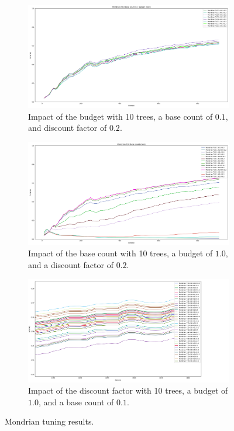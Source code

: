 \begin{figure}
	 \centering
	 \begin{subfigure}[b]{0.49\textwidth}
		 \centering
		 \includegraphics[width=\textwidth]{figures/Banos_S1_shuf_Mondrian_T10_bc_0.1_budget_check.png}
		 \caption{Impact of the budget with 10 trees, a base count of $0.1$, and discount factor of $0.2$.}
		 \label{fig:mondrian-budget}
	 \end{subfigure}
	 \hfill
	 \begin{subfigure}[b]{0.49\textwidth}
		 \centering
		 \includegraphics[width=\textwidth]{figures/Banos_S1_shuf_Mondrian_T10_check.png}
		 \caption{Impact of the base count with 10 trees, a budget of $1.0$, and a discount factor of $0.2$.}
		 \label{fig:mondrian-base-count}
	 \end{subfigure}
	 \hfill
	 \begin{subfigure}[b]{0.49\textwidth}
		 \centering
		 \includegraphics[width=\textwidth]{figures/Banos_S1_disount_check.png}
		 \caption{Impact of the discount factor with 10 trees, a budget of $1.0$, and a base count of $0.1$.}
		 \label{fig:mondrian-discount}
	 \end{subfigure}
		\caption{Mondrian tuning results.}
		\label{fig:mondrian-tuning}
\end{figure}


